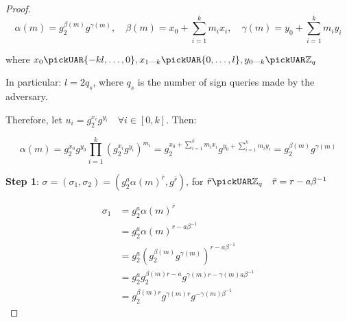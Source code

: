 \begin{proof}
    \begin{equation*}
        \alpha(m) = g_2^{\beta(m)}g^{\gamma(m)},\quad \beta(m) = x_0 + \sum_{i=1}^{k}m_ix_i,\quad \gamma(m) = y_0 + \sum_{i=1}^{k}m_iy_i
    \end{equation*}

    where $x_0 \pickUAR \{-kl, \dots, 0\}, x_{1\text{---}k} \pickUAR \{0, \dots, l\}, y_{0\text{---}k} \pickUAR \mathbb{Z}_q$

    In particular: $l = 2q_s$, where $q_s$ is the number of sign queries made by the adversary.

    Therefore, let $u_i = g_2^{x_i}g^{y_i} \quad \forall i \in [0, k]$. Then:

    \begin{equation*}
        \alpha(m) = g_2^{x_0}g^{y_0} \prod_{i=1}^k (g_2^{x_i}g^{y_i})^{m_i} = g_2^{x_0+\sum_{i=1}^k m_ix_i}g^{y_0+\sum_{i=1}^k m_iy_i} = g_2^{\beta(m)}g^{\gamma(m)}
    \end{equation*}


    \textbf{Step 1}: $\sigma = (\sigma_1, \sigma_2) = (g_2^a \alpha(m)^{\bar{r}}, g^{\bar{r}})$, for $\bar{r} \pickUAR \mathbb{Z}_q \quad \bar{r} = r - a\beta^{-1}$

    \begin{align*}
        \sigma_1 &= g_2^a\alpha(m)^{\bar{r}} \\
        &= g_2^a\alpha(m)^{r - a\beta^{-1}} \\
        &= g_2^a (g_2^{\beta(m)} g^{\gamma(m)})^{r - a\beta^{-1}} \\
        &= g_2^a g_2^{\beta(m)r-a} g^{\gamma(m)r - \gamma(m)a\beta^{-1}} \\
        &= g_2^{\beta(m)r} g^{\gamma(m)r} g^{-\gamma(m)\beta^{-1}}
    \end{align*}

\end{proof}


